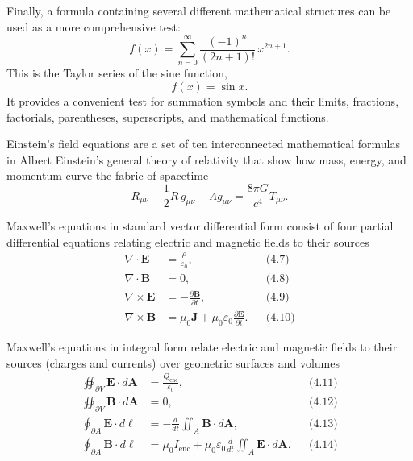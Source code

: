 \documentclass[
11pt,
a4paper,
oneside
]{scrbook}
\begin{document}
Finally, a formula containing several different mathematical structures can be used as a more comprehensive test:
\begin{equation}
	f(x)
	=
	\sum_{n=0}^{\infty}
	\frac{(-1)^n}{(2n+1)!}\,
	x^{2n+1}.
	\tag{4.4}
\end{equation}
This is the Taylor series of the sine function,
\begin{equation}
	f(x)=\sin x.
	\tag{4.5}
\end{equation}
It provides a convenient test for summation symbols and their limits, fractions, factorials, parentheses, superscripts, and mathematical functions.

Einstein's field equations are a set of ten interconnected mathematical formulas in Albert Einstein's general theory of relativity that show how mass, energy, and momentum curve the fabric of spacetime
\begin{equation}
	R_{\mu\nu}
	-\frac{1}{2}R\,g_{\mu\nu}
	+\Lambda g_{\mu\nu}
	=
	\frac{8\pi G}{c^4}T_{\mu\nu} .
	\tag{4.6}
\end{equation}

Maxwell's equations in standard vector differential form consist of four partial differential equations relating electric and magnetic fields to their sources
\begin{align}
	\nabla \cdot \mathbf{E}
	&= \frac{\rho}{\varepsilon_0},
	&&\text{(4.7)}
	\\
	\nabla \cdot \mathbf{B}
	&= 0,
	&&\text{(4.8)}
	\\
	\nabla \times \mathbf{E}
	&= -\frac{\partial \mathbf{B}}{\partial t},
	&&\text{(4.9)}
	\\
	\nabla \times \mathbf{B}
	&= \mu_0 \mathbf{J}
	+ \mu_0\varepsilon_0
	\frac{\partial \mathbf{E}}{\partial t}.
	&&\text{(4.10)}
\end{align}

Maxwell's equations in integral form relate electric and magnetic fields to their sources (charges and currents) over geometric surfaces and volumes
\begin{align}
	\oiint_{\partial V}
	\mathbf{E}\cdot d\mathbf{A}
	&= \frac{Q_{\mathrm{enc}}}{\varepsilon_0},
	&&\text{(4.11)}
	\\
	\oiint_{\partial V}
	\mathbf{B}\cdot d\mathbf{A}
	&= 0,
	&&\text{(4.12)}
	\\
	\oint_{\partial A}
	\mathbf{E}\cdot d\boldsymbol{\ell}
	&= -\frac{d}{dt}
	\iint_A \mathbf{B}\cdot d\mathbf{A},
	&&\text{(4.13)}
	\\
	\oint_{\partial A}
	\mathbf{B}\cdot d\boldsymbol{\ell}
	&= \mu_0 I_{\mathrm{enc}}
	+ \mu_0\varepsilon_0
	\frac{d}{dt}
	\iint_A \mathbf{E}\cdot d\mathbf{A}.
	&&\text{(4.14)}
\end{align}
\end{document}
